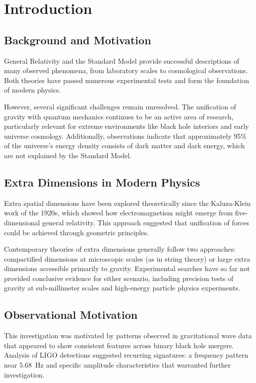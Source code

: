 \documentclass[12pt]{iopart}
\begin{document}
\section{Introduction}

\subsection{Background and Motivation}

General Relativity and the Standard Model provide successful descriptions of many observed phenomena, from laboratory scales to cosmological observations. Both theories have passed numerous experimental tests and form the foundation of modern physics.

However, several significant challenges remain unresolved. The unification of gravity with quantum mechanics continues to be an active area of research, particularly relevant for extreme environments like black hole interiors and early universe cosmology. Additionally, observations indicate that approximately 95\% of the universe's energy density consists of dark matter and dark energy, which are not explained by the Standard Model.

\subsection{Extra Dimensions in Modern Physics}

Extra spatial dimensions have been explored theoretically since the Kaluza-Klein work of the 1920s, which showed how electromagnetism might emerge from five-dimensional general relativity. This approach suggested that unification of forces could be achieved through geometric principles.

Contemporary theories of extra dimensions generally follow two approaches: compactified dimensions at microscopic scales (as in string theory) or large extra dimensions accessible primarily to gravity. Experimental searches have so far not provided conclusive evidence for either scenario, including precision tests of gravity at sub-millimeter scales and high-energy particle physics experiments.

\subsection{Observational Motivation}

This investigation was motivated by patterns observed in gravitational wave data that appeared to show consistent features across binary black hole mergers. Analysis of LIGO detections suggested recurring signatures: a frequency pattern near \SI{5.68}{\hertz} and specific amplitude characteristics that warranted further investigation.
\end{document}
